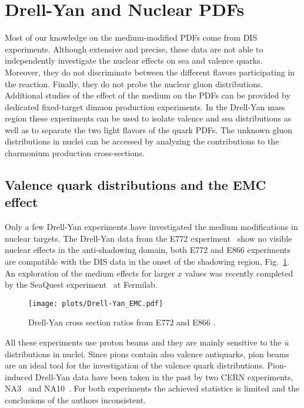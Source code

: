 \section{Drell-Yan and Nuclear PDFs\label{sec:DY}}
%
Most of our knowledge on the medium-modified PDFs come from DIS experiments. Although extensive and precise, 
these data are not able to independently investigate the nuclear effects on sea and valence quarks.  
Moreover, they do not discriminate between the different flavors participating in the reaction. Finally, 
they do not probe the nuclear gluon distributions. Additional studies of the effect of the medium on the 
PDFs can be provided by dedicated fixed-target dimuon production experiments. In the Drell-Yan mass region
 these experiments can be used to isolate  
valence and sea distributions as well as to separate the two light flavors of the quark PDFs. 
The unknown gluon distributions in nuclei can be accessed by analyzing the contributions to  
the charmonium production cross-sections. 
 
\subsection {Valence quark distributions and the EMC effect}
Only a few Drell-Yan experiments have investigated the medium modifications in nuclear targets. 
The Drell-Yan data from the E772 experiment~\cite{Alde:1990im} show no visible nuclear effects in 
the anti-shadowing domain, both E772 and E866 experiments~\cite{Vasilev:1999fa} are compatible 
with the DIS data in the onset of the shadowing region, Fig.~\ref{fig:drell-yan}.  An exploration of the medium effects for larger $x$ 
values was recently completed by the SeaQuest experiment~\cite{seaquest} at Fermilab. 

\begin{figure}[tbp]
  \centering\texttt{[image: plots/Drell-Yan\_EMC.pdf]}
  \caption{Drell-Yan cross section ratios from E772 and E866 \cite{Alde:1990im, Vasilev:1999fa}.}
  \label{fig:drell-yan}
\end{figure}

All these experiments use proton beams and they are mainly sensitive to the $\bar{u}$
distributions in nuclei.  Since pions contain also valence antiquarks, pion beams are  
an ideal tool for the investigation of the valence quark distributions. Pion-induced Drell-Yan data have 
been taken in the past by two CERN experiments, NA3~\cite{Badier:1981ci} 
and NA10~\cite{Bordalo:1987cs}.  For both experiments the achieved statistics is limited
and the conclusions of the authors inconsistent.  

